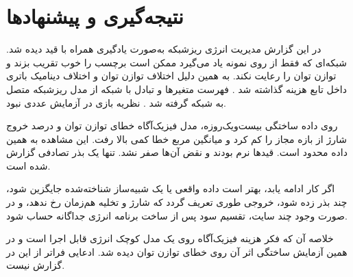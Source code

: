 \chapter{نتیجه‌گیری و پیشنهادها}
\label{chap:conclusion}

در این گزارش مدیریت انرژی ریزشبکه به‌صورت یادگیری همراه با قید دیده شد. شبکه‌ای که فقط از روی نمونه یاد می‌گیرد ممکن است برچسب را خوب تقریب بزند و توازن توان را رعایت نکند. به همین دلیل اختلاف توازن توان و اختلاف دینامیک باتری داخل تابع هزینه گذاشته شد . فهرست متغیرها و تبادل با شبکه از مدل ریزشبکه متصل به شبکه گرفته شد . نظریه بازی در آزمایش عددی نبود.

روی داده ساختگی بیست‌ویک‌روزه، مدل فیزیک‌آگاه خطای توازن توان و درصد خروج شارژ از بازه مجاز را کم کرد و میانگین مربع خطا کمی بالا رفت. این مشاهده به همین داده محدود است. قیدها نرم بودند و نقض آن‌ها صفر نشد. تنها یک بذر تصادفی گزارش شده است.

اگر کار ادامه یابد، بهتر است داده واقعی یا یک شبیه‌ساز شناخته‌شده جایگزین شود، چند بذر زده شود، خروجی طوری تعریف گردد که شارژ و تخلیه هم‌زمان رخ ندهد، و در صورت وجود چند سایت، تقسیم سود پس از ساخت برنامه انرژی جداگانه حساب شود.

خلاصه آن که فکر هزینه فیزیک‌آگاه روی یک مدل کوچک انرژی قابل اجرا است و در همین آزمایش ساختگی اثر آن روی خطای توازن توان دیده شد. ادعایی فراتر از این در گزارش نیست.
